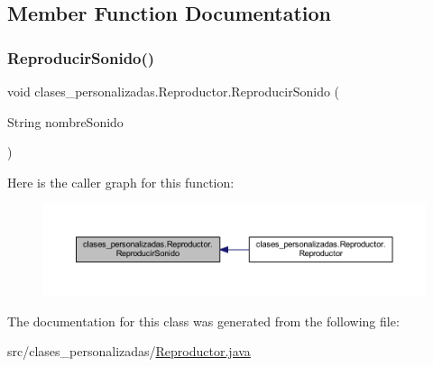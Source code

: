 \subsection{Member Function Documentation}
\mbox{\label{classclases__personalizadas_1_1_reproductor_ad2f1672777df1378f356c702eb44009f}} 
\subsubsection{\texorpdfstring{Reproducir\+Sonido()}{ReproducirSonido()}}
{\footnotesize\ttfamily void clases\+\_\+personalizadas.\+Reproductor.\+Reproducir\+Sonido (\begin{DoxyParamCaption}\item[{String}]{nombre\+Sonido }\end{DoxyParamCaption})}

Here is the caller graph for this function\+:
\nopagebreak
\begin{figure}[H]
\begin{center}
\leavevmode
\includegraphics[width=350pt]{classclases__personalizadas_1_1_reproductor_ad2f1672777df1378f356c702eb44009f_icgraph}
\end{center}
\end{figure}


The documentation for this class was generated from the following file\+:\begin{DoxyCompactItemize}
\item 
src/clases\+\_\+personalizadas/\mbox{\hyperlink{_reproductor_8java}{Reproductor.\+java}}\end{DoxyCompactItemize}
